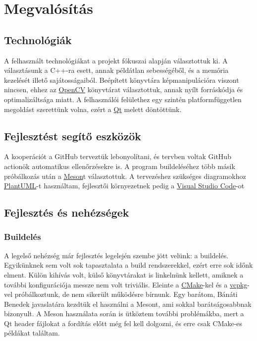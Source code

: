 \chapter{Megvalósítás}

\section{Technológiák}

A felhasznált technológiákat a projekt fókuszai alapján választottuk ki. 
A választásunk a C++-ra esett, annak példátlan sebességéből, és a memória kezelését illető sajátosságaiból. Beépített könyvtára képmanipulációra viszont nincsen, ehhez az \href{https://en.wikipedia.org/wiki/OpenCV}{OpenCV} könyvtárat választottuk, annak nyílt forráskódja és optimalizáltsága miatt.
A felhasználói felülethez egy szintén platformfüggetlen megoldást szerettünk volna, ezért a \href{https://en.wikipedia.org/wiki/Qt_(software)}{Qt} melett döntöttünk. 

\section{Fejlesztést segítő eszközök}

A kooperációt a GitHub terveztük lebonyolítani, és tervben voltak GitHub actionök automatikus ellenőrzésekre is. A program buildeléséhez több másik próbálkozás után a \href{https://en.wikipedia.org/wiki/Meson_(software)}{Meson}t választottuk. A tervezéshez szükséges diagramokhoz \href{https://en.wikipedia.org/wiki/PlantUML}{PlantUML}-t használtam, fejlesztői környezetnek pedig a \href{https://en.wikipedia.org/wiki/Visual_Studio_Code}{Visual Studio Code}-ot

\section{Fejlesztés és nehézségek}

\subsection{Buildelés}

A legelső nehézség már fejlesztés legelején szembe jött velünk: a buildelés. Egyikünknek sem volt sok tapasztalata a build rendszerekkel, ezért erre sok időnk elment. Külön kihívás volt, külső könyvtárakat is linkelnünk kellett, amiknek a további konfigurációja messze nem volt triviális. Eleinte a \href{https://en.wikipedia.org/wiki/CMake}{CMake}-kel és a \href{https://en.wikipedia.org/wiki/Vcpkg}{vcpkg}-vel próbálkoztunk, de nem sikerült működésre bírnunk. Egy barátom, Bánáti Benedek javaslatára kezdtük el használni a Mesont, ami sokkal barátságosabbnak bizonyult. A Meson használata során is ütköztem további problémákba, mert a Qt header fájlokat a fordítás előtt még fel kell dolgozni, és erre csak CMake-es példákat találtam.

